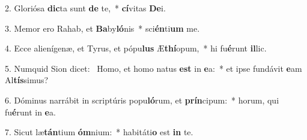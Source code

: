 2. Gloriósa \textbf{dic}ta sunt \textbf{de} te,~*  \textbf{cí}vitas \textbf{De}i.\

3. Memor ero Rahab, et \textbf{Ba}by\textbf{ló}nis~*  sci\textbf{én}ti\textbf{um} me.\

4. Ecce alienígenæ, et Tyrus, et pópu\textbf{lus} Æ\textbf{thí}opum,~*  hi fu\textbf{é}runt \textbf{il}lic.\

5. Numquid Sion dicet: \dag\  Homo, et homo natus \textbf{est} in \textbf{e}a:~*  et ipse fundávit \textbf{e}am Al\textbf{tís}simus?\

6. Dóminus narrábit in scriptúris popu\textbf{ló}rum, et \textbf{prín}cipum:~*  horum, qui fu\textbf{é}runt in \textbf{e}a.\

7. Sicut læ\textbf{tán}tium \textbf{óm}nium:~*  habitáti\textbf{o} est \textbf{in} te.\

